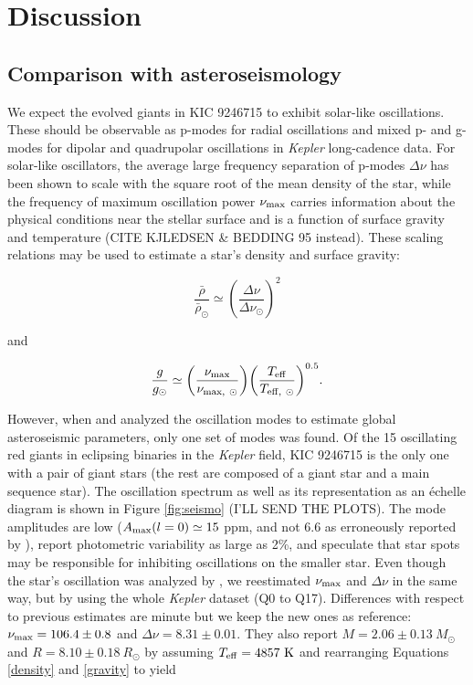 \section{Discussion}\label{discuss}

\subsection{Comparison with asteroseismology}\label{seismo}

We expect the evolved giants in KIC 9246715 to exhibit solar-like oscillations. These should be observable as p-modes for radial oscillations and mixed p- and g- modes for dipolar and quadrupolar oscillations in \emph{Kepler} long-cadence data. For solar-like oscillators, the average large frequency separation of p-modes $\Delta \nu$ has been shown to scale with the square root of the mean density of the star, while the frequency of maximum oscillation power $\nu_{\rm{max}}$ carries information about the physical conditions near the stellar surface and is a function of surface gravity and temperature \citep{cha13} (CITE KJLEDSEN \& BEDDING 95 instead). These scaling relations may be used to estimate a star's density and surface gravity:

\begin{equation} \label{density}
{\frac{\bar{\rho}}{\bar{\rho}_{\odot}}} \simeq {\left( \frac{\Delta \nu}{\Delta \nu_{\odot}} \right)}^{2}
\end{equation}

and

\begin{equation} \label{gravity}
{\frac{g}{g_{\odot}}} \simeq {\left( \frac{\nu_{\rm{max}}}{\nu_{\rm{max}, \ \odot}} \right)} {\left( \frac{T_{\rm{eff}}}{T_{\rm{eff}, \ \odot}} \right)}^{0.5}.
\end{equation}

However, when \citet{gau13} and \citet{gau14} analyzed the oscillation modes to estimate global asteroseismic parameters, only one set of modes was found. Of the 15 oscillating red giants in eclipsing binaries in the \emph{Kepler} field, KIC 9246715 is the only one with a pair of giant stars (the rest are composed of a giant star and a main sequence star). The oscillation spectrum as well as its representation as an \'echelle diagram is shown in Figure \ref{fig:seismo} (I'LL SEND THE PLOTS). The mode amplitudes are low ($A_{\rm{max}}(l=0) \simeq 15$ ppm,  and not 6.6 as erroneously reported by \citealt{gau14}), report photometric variability as large as 2\%, and speculate that star spots may be responsible for inhibiting oscillations on the smaller star. Even though the star's oscillation was analyzed by \citet{gau14}, we reestimated $\nu_{\rm{max}}$ and $\Delta\nu$ in the same way, but by using the whole \textit{Kepler} dataset (Q0 to Q17). Differences with respect to previous estimates are minute but we keep the new ones as reference: $\nu_{\rm{max}} = 106.4 \pm 0.8$ and $\Delta\nu=8.31\pm0.01$. They also report $M = 2.06 \pm 0.13 \ M_{\odot}$ and $R = 8.10 \pm 0.18 \ R_{\odot}$ by assuming $T_{\rm{eff}} = 4857 \ \rm{K}$ and rearranging Equations \ref{density} and \ref{gravity} to yield

